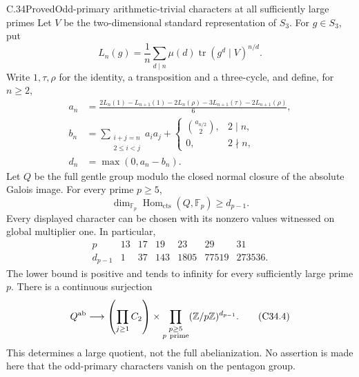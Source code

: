 \begin{statement}{C.34}{Proved}{Odd-primary arithmetic-trivial characters at all sufficiently large primes}
Let $V$ be the two-dimensional standard representation of $S_3$.
For $g\in S_3$, put
\[
 L_n(g)=\frac1n\sum_{d\mid n}\mu(d)
                   \operatorname{tr}(g^d\mid V)^{n/d}.
\]
Write $1,\tau,\rho$ for the identity, a transposition and a
three-cycle, and define, for $n\geq2$,
\[
\begin{split}
 a_n&=\frac{2L_n(1)-L_{n+1}(1)-2L_n(\rho)
                 -3L_{n+1}(\tau)-2L_{n+1}(\rho)}6,\\
 b_n&=\sum_{\substack{i+j=n\\2\leq i<j}}a_i a_j
              +\begin{cases}\binom{a_{n/2}}2,&2\mid n,\\0,&2\nmid n,\end{cases}\\
 d_n&=\max(0,a_n-b_n).
\end{split}                                                     \tag{C34.1}
\]
Let $Q$ be the full gentle group modulo the closed normal closure
of the absolute Galois image.  For every prime $p\geq5$,
\[
 \dim_{\mathbb F_p}\operatorname{Hom}_{\mathrm{cts}}(Q,\mathbb F_p)
                       \geq d_{p-1}.                            \tag{C34.2}
\]
Every displayed character can be chosen with its nonzero values
witnessed on global multiplier one.  In particular,
\[
\begin{array}{c|rrrrrr}
 p&13&17&19&23&29&31\\ \hline
 d_{p-1}&1&37&143&1805&77519&273536 .
\end{array}                                                     \tag{C34.3}
\]
The lower bound is positive and tends to infinity for every
sufficiently large prime $p$.  There is a continuous surjection
\[
 Q^{\mathrm{ab}}\longrightarrow
 \left(\prod_{j\geq1}C_2\right)
       \times\prod_{\substack{p\geq5\\p\ {\rm prime}}}
                         (\mathbb Z/p\mathbb Z)^{d_{p-1}} .
                                                               \tag{C34.4}
\]
This determines a large quotient, not the full abelianization.
No assertion is made here that the odd-primary characters
vanish on the pentagon group.
\end{statement}
